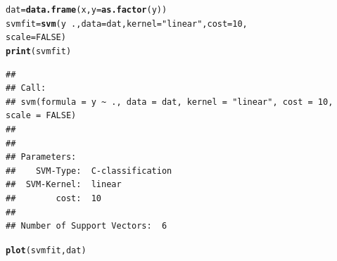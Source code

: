 \documentclass[aspectratio=169]{beamer}\usepackage[]{graphicx}\usepackage[]{xcolor}
\makeatletter
\newcommand{\hlnum}[1]{\textcolor[rgb]{0.686,0.059,0.569}{#1}}%
\newcommand{\hlsng}[1]{\textcolor[rgb]{0.192,0.494,0.8}{#1}}%
\newcommand{\hlopt}[1]{\textcolor[rgb]{0,0,0}{#1}}%
\newcommand{\hldef}[1]{\textcolor[rgb]{0.345,0.345,0.345}{#1}}%
\newcommand{\hlkwb}[1]{\textcolor[rgb]{0.69,0.353,0.396}{#1}}%
\newcommand{\hlkwc}[1]{\textcolor[rgb]{0.333,0.667,0.333}{#1}}%
\newcommand{\hlkwd}[1]{\textcolor[rgb]{0.737,0.353,0.396}{\textbf{#1}}}%
\newenvironment{kframe}{%
 \def\at@end@of@kframe{}%
 \ifinner\ifhmode%
  \def\at@end@of@kframe{\end{minipage}}%
  \begin{minipage}{\columnwidth}%
 \fi\fi%
 \def\FrameCommand##1{\hskip\@totalleftmargin \hskip-\fboxsep
 \colorbox{shadecolor}{##1}\hskip-\fboxsep
     \hskip-\linewidth \hskip-\@totalleftmargin \hskip\columnwidth}%
 \MakeFramed {\advance\hsize-\width
   \@totalleftmargin\z@ \linewidth\hsize
   \@setminipage}}%
 {\par\unskip\endMakeFramed%
 \at@end@of@kframe}
\newenvironment{knitrout}{}{} %
\makeatother
\begin{document}

\begin{frame}[fragile]
\begin{knitrout}
\color{fgcolor}\begin{kframe}
\begin{alltt}
\hldef{dat} \hlkwb{=} \hlkwd{data.frame}\hldef{(x,} \hlkwc{y} \hldef{=} \hlkwd{as.factor}\hldef{(y))}
\hldef{svmfit} \hlkwb{=} \hlkwd{svm}\hldef{(y} \hlopt{~} \hldef{.,} \hlkwc{data} \hldef{= dat,} \hlkwc{kernel} \hldef{=} \hlsng{"linear"}\hldef{,} \hlkwc{cost} \hldef{=} \hlnum{10}\hldef{,}
             \hlkwc{scale} \hldef{=} \hlnum{FALSE}\hldef{)}
\hlkwd{print}\hldef{(svmfit)}
\end{alltt}
\begin{verbatim}
## 
## Call:
## svm(formula = y ~ ., data = dat, kernel = "linear", cost = 10, scale = FALSE)
## 
## 
## Parameters:
##    SVM-Type:  C-classification 
##  SVM-Kernel:  linear 
##        cost:  10 
## 
## Number of Support Vectors:  6
\end{verbatim}
\begin{alltt}
\hlkwd{plot}\hldef{(svmfit, dat)}
\end{alltt}
\end{kframe}
\end{knitrout}
\end{frame}

\end{document}

